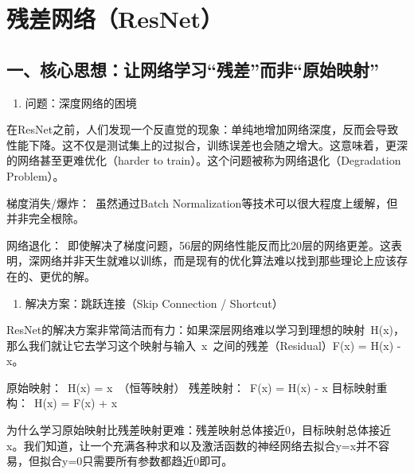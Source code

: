 \setcounter{section}{3}

\hypertarget{ux6b8bux5deeux7f51ux7edcresnet}{%
\section{残差网络（ResNet）}\label{ux6b8bux5deeux7f51ux7edcresnet}}

\hypertarget{ux4e00ux6838ux5fc3ux601dux60f3ux8ba9ux7f51ux7edcux5b66ux4e60ux6b8bux5deeux800cux975eux539fux59cbux6620ux5c04}{%
\subsection{一、核心思想：让网络学习``残差''而非``原始映射''}\label{ux4e00ux6838ux5fc3ux601dux60f3ux8ba9ux7f51ux7edcux5b66ux4e60ux6b8bux5deeux800cux975eux539fux59cbux6620ux5c04}}

\begin{enumerate}
\def\labelenumi{\arabic{enumi}.}
\tightlist
\item
  问题：深度网络的困境
\end{enumerate}

在ResNet之前，人们发现一个反直觉的现象：单纯地增加网络深度，反而会导致性能下降。这不仅是测试集上的过拟合，训练误差也会随之增大。这意味着，更深的网络甚至更难优化（harder to train）。这个问题被称为网络退化（Degradation Problem）。

梯度消失/爆炸：~虽然通过Batch Normalization等技术可以很大程度上缓解，但并非完全根除。

网络退化：~即使解决了梯度问题，56层的网络性能反而比20层的网络更差。这表明，深网络并非天生就难以训练，而是现有的优化算法难以找到那些理论上应该存在的、更优的解。

\begin{enumerate}
\def\labelenumi{\arabic{enumi}.}
\setcounter{enumi}{1}
\tightlist
\item
  解决方案：跳跃连接（Skip Connection / Shortcut）
\end{enumerate}

ResNet的解决方案非常简洁而有力：如果深层网络难以学习到理想的映射~H(x)，那么我们就让它去学习这个映射与输入~x~之间的残差（Residual）F(x) = H(x) - x。

原始映射：~H(x) = x~（恒等映射）
残差映射：~F(x) = H(x) - x
目标映射重构：~H(x) = F(x) + x

为什么学习原始映射比残差映射更难：残差映射总体接近0，目标映射总体接近x。我们知道，让一个充满各种求和以及激活函数的神经网络去拟合y=x并不容易，但拟合y=0只需要所有参数都趋近0即可。

